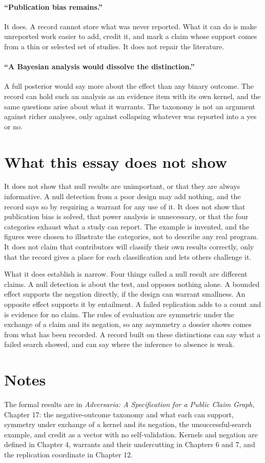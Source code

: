 \documentclass[11pt]{article}
\begin{document}
\paragraph{``Publication bias remains.''} It does. A record cannot store what was never reported. What it can do is make unreported work easier to add, credit it, and mark a claim whose support comes from a thin or selected set of studies. It does not repair the literature.

\paragraph{``A Bayesian analysis would dissolve the distinction.''} A full posterior would say more about the effect than any binary outcome. The record can hold such an analysis as an evidence item with its own kernel, and the same questions arise about what it warrants. The taxonomy is not an argument against richer analyses, only against collapsing whatever was reported into a yes or no.

\section{What this essay does not show}\label{sec:limits}

It does not show that null results are unimportant, or that they are always informative. A null detection from a poor design may add nothing, and the record says so by requiring a warrant for any use of it. It does not show that publication bias is solved, that power analysis is unnecessary, or that the four categories exhaust what a study can report. The example is invented, and the figures were chosen to illustrate the categories, not to describe any real program. It does not claim that contributors will classify their own results correctly, only that the record gives a place for each classification and lets others challenge it.

What it does establish is narrow. Four things called a null result are different claims. A null detection is about the test, and opposes nothing alone. A bounded effect supports the negation directly, if the design can warrant smallness. An opposite effect supports it by entailment. A failed replication adds to a count and is evidence for no claim. The rules of evaluation are symmetric under the exchange of a claim and its negation, so any asymmetry a dossier shows comes from what has been recorded. A record built on these distinctions can say what a failed search showed, and can say where the inference to absence is weak.

\section*{Notes}

The formal results are in \emph{Adversaria: A Specification for a Public Claim Graph}, Chapter 17: the negative-outcome taxonomy and what each can support, symmetry under exchange of a kernel and its negation, the unsuccessful-search example, and credit as a vector with no self-validation. Kernels and negation are defined in Chapter 4, warrants and their undercutting in Chapters 6 and 7, and the replication coordinate in Chapter 12.
\end{document}
